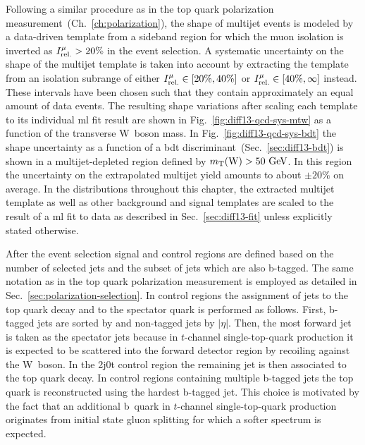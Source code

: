 Following a similar procedure as in the top quark polarization measurement~(Ch.~\ref{ch:polarization}), the shape of multijet events is modeled by a data-driven template from a sideband region for which the muon isolation is inverted as $\muiso>20\%$ in the event selection. A systematic uncertainty on the shape of the multijet template is taken into account by extracting the template from an isolation subrange of either $\muiso\in[20\%,40\%]$ or $\muiso\in[40\%,\infty]$ instead. These intervals have been chosen such that they contain approximately an equal amount of data events. The resulting shape variations after scaling each template to its individual \gls{ml} fit result are shown in Fig.~\ref{fig:diff13-qcd-sys-mtw} as a function of the transverse W~boson mass. In Fig.~\ref{fig:diff13-qcd-sys-bdt} the shape uncertainty as a function of a \gls{bdt} discriminant~(Sec.~\ref{sec:diff13-bdt}) is shown in a multijet-depleted region defined by $m_{\textrm{T}}(\textrm{W})>50~\textrm{GeV}$. In this region the uncertainty on the extrapolated multijet yield amounts to about $\pm20\%$ on average. In the distributions throughout this chapter, the extracted multijet template as well as other background and signal templates are scaled to the result of a \gls{ml} fit to data as described in Sec.~\ref{sec:diff13-fit} unless explicitly stated otherwise.



After the event selection signal and control regions are defined based on the number of selected jets and the subset of jets which are also b-tagged. The same notation as in the top quark polarization measurement is employed as detailed in Sec.~\ref{sec:polarization-selection}. In control regions the assignment of jets to the top quark decay and to the spectator quark is performed as follows. First, b-tagged jets are sorted by \pt and non-tagged jets by $|\eta|$. Then, the most forward jet is taken as the spectator jets because in $t$-channel single-top-quark production it is expected to be scattered into the forward detector region by recoiling against the W~boson. In the 2j0t control region the remaining jet is then associated to the top quark decay. In control regions containing multiple b-tagged jets the top quark is reconstructed using the hardest b-tagged jet. This choice is motivated by the fact that an additional b~quark in $t$-channel single-top-quark production originates from initial state gluon splitting for which a softer spectrum is expected.

